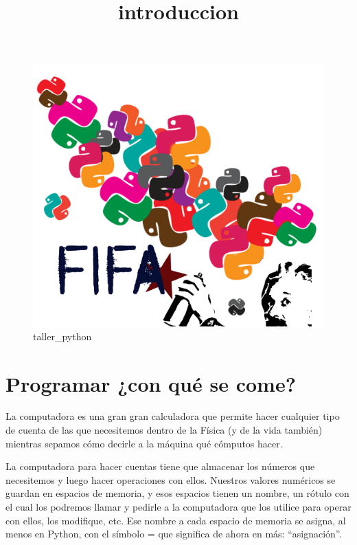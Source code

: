 \documentclass{article}
\title{introduccion}
\begin{document}
    
    
    \maketitle
    
    

    
    \begin{figure}[htbp]
\centering
\includegraphics{logos_python_fifa.png}
\caption{taller\_python}
\end{figure}

    \section{Programar ¿con qué se
come?}\label{programar-con-quuxe9-se-come}

    La computadora es una gran gran calculadora que permite hacer cualquier
tipo de cuenta de las que necesitemos dentro de la Física (y de la vida
también) mientras sepamos cómo decirle a la máquina qué cómputos hacer.

La computadora para hacer cuentas tiene que almacenar los números que
necesitemos y luego hacer operaciones con ellos. Nuestros valores
numéricos se guardan en espacios de memoria, y esos espacios tienen un
nombre, un rótulo con el cual los podremos llamar y pedirle a la
computadora que los utilice para operar con ellos, los modifique, etc.
Ese nombre a cada espacio de memoria se asigna, al menos en Python, con
el símbolo = que significa de ahora en más: ``asignación''.
\end{document}

